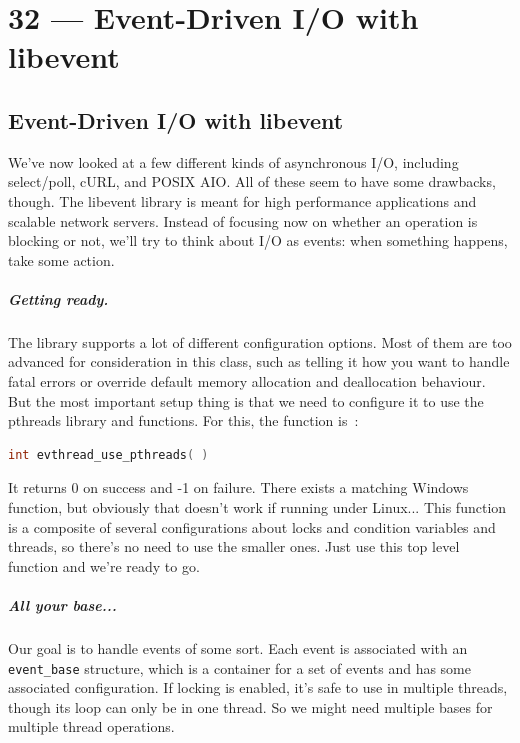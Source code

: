 \documentclass[a4paper]{report}
\begin{document}
\chapter*{32 --- Event-Driven I/O with libevent}


\section*{Event-Driven I/O with libevent}

We've now looked at a few different kinds of asynchronous I/O, including select/poll, cURL, and POSIX AIO. All of these seem to have some drawbacks, though. The libevent library is meant for high performance applications and scalable network servers. Instead of focusing now on whether an operation is blocking or not, we'll try to think about I/O as events: when something happens, take some action.

\paragraph{Getting ready.} The library supports a lot of different configuration options. Most of them are too advanced for consideration in this class, such as telling it how you want to handle fatal errors or override default memory allocation and deallocation behaviour. But the most important setup thing is that we need to configure it to use the pthreads library and functions. For this, the function is~\cite{libevent}:

\begin{lstlisting}[language=C]
int evthread_use_pthreads( )
\end{lstlisting}

It returns 0 on success and -1 on failure. There exists a matching Windows function, but obviously that doesn't work if running under Linux... This function is a composite of several configurations about locks and condition variables and threads, so there's no need to use the smaller ones. Just use this top level function and we're ready to go.

\paragraph{All your base...} Our goal is to handle events of some sort. Each event is associated with an \texttt{event\_base} structure, which is a container for a set of events and has some associated configuration. If locking is enabled, it's safe to use in multiple threads, though its loop can only be in one thread. So we might need multiple bases for multiple thread operations.
\end{document}
